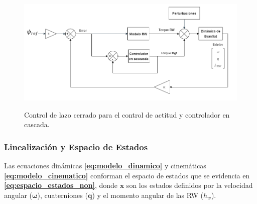 \begin{itemize}
	 \begin{figure}[!ht]
	 	\begin{center}
	 		\includegraphics[scale=0.55]{imagenes/controladores/Diagrama_controlador2.PNG}\\
	 	\end{center}
	 	\caption{Control de lazo cerrado para el control de actitud y controlador en cascada.}
	 	\label{fig:desaturacionDiagrama2}	 	
	 \end{figure} 	  
\end{itemize}



\subsubsection{Linealización y Espacio de Estados}
\hfill \break
Las ecuaciones dinámicas \textbf{\eqref{eq:modelo_dinamico}} y cinemáticas \textbf{\eqref{eq:modelo_cinematico}} conforman el espacio de estados que se evidencia en 
\textbf{\eqref{eq:espacio_estados_non}}, donde $\boldsymbol{x}$ son los estados definidos por la velocidad angular ($\boldsymbol{\omega}$), cuaterniones ($\boldsymbol{q}$) y el momento angular de las RW ($h_w$). 

